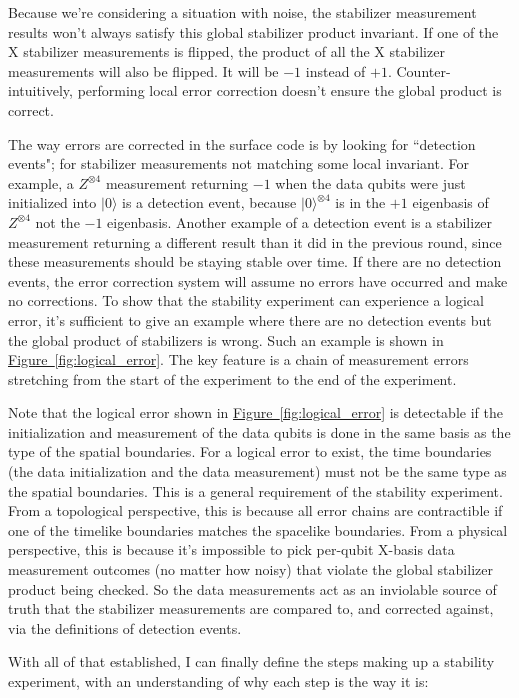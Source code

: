 \documentclass[onecolumn,unpublished,a4paper]{quantumarticle}
\theoremstyle{definition}
\theoremstyle{definition}
\theoremstyle{definition}
\newcommand{\fig}[1]{\hyperref[fig:#1]{Figure~\ref*{fig:#1}}}
\begin{document}
Because we're considering a situation with noise, the stabilizer measurement results won't always satisfy this global stabilizer product invariant.
If one of the X stabilizer measurements is flipped, the product of all the X stabilizer measurements will also be flipped.
It will be $-1$ instead of $+1$.
Counter-intuitively, performing local error correction doesn't ensure the global product is correct.

The way errors are corrected in the surface code is by looking for ``detection events"; for stabilizer measurements not matching some local invariant.
For example, a $Z^{\otimes 4}$ measurement returning $-1$ when the data qubits were just initialized into $|0\rangle$ is a detection event, because $|0\rangle^{\otimes 4}$ is in the $+1$ eigenbasis of $Z^{\otimes 4}$ not the $-1$ eigenbasis.
Another example of a detection event is a stabilizer measurement returning a different result than it did in the previous round, since these measurements should be staying stable over time.
If there are no detection events, the error correction system will assume no errors have occurred and make no corrections.
To show that the stability experiment can experience a logical error, it's sufficient to give an example where there are no detection events but the global product of stabilizers is wrong.
Such an example is shown in \fig{logical_error}.
The key feature is a chain of measurement errors stretching from the start of the experiment to the end of the experiment.

Note that the logical error shown in \fig{logical_error} is detectable if the initialization and measurement of the data qubits is done in the same basis as the type of the spatial boundaries.
For a logical error to exist, the time boundaries (the data initialization and the data measurement) must not be the same type as the spatial boundaries.
This is a general requirement of the stability experiment.
From a topological perspective, this is because all error chains are contractible if one of the timelike boundaries matches the spacelike boundaries.
From a physical perspective, this is because it's impossible to pick per-qubit X-basis data measurement outcomes (no matter how noisy) that violate the global stabilizer product being checked.
So the data measurements act as an inviolable source of truth that the stabilizer measurements are compared to, and corrected against, via the definitions of detection events.

With all of that established, I can finally define the steps making up a stability experiment, with an understanding of why each step is the way it is:
\end{document}
